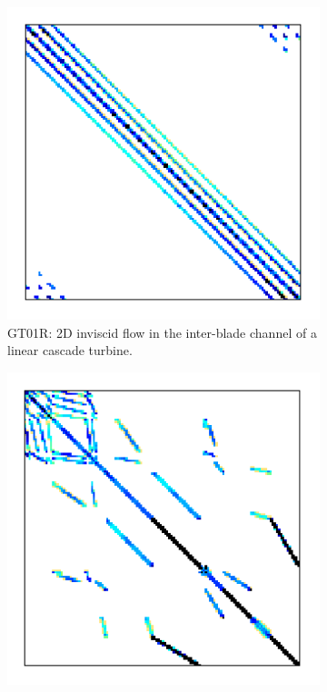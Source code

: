   		\begin{figure}
  			\centering
  			\begin{subfigure}[t]{0.3\textwidth}
  				\centering
  				\includegraphics[width=\textwidth]{figures/GT01R.png}
          \caption{GT01R: 2D inviscid flow in the inter-blade channel of a linear cascade turbine.}
  				\label{fig:sparse.GT01R}
  			\end{subfigure}
  			\hfill
  			\begin{subfigure}[t]{0.3\textwidth}
  				\centering
  				\includegraphics[width=\textwidth]{figures/HV15R.png}

\end{subfigure}
\end{figure}
